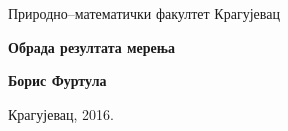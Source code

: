 \documentclass[a4paper,twoside]{book}
\begin{document}
\frontmatter
{}
\baselineskip=0.30in
\allowdisplaybreaks

\begin{center}

\begin{sffamily}

{\large Природно--математички факултет Крагујевац}

\thispagestyle{empty}


\vspace*{7cm}
{\mdseries
{\HUGE\textbf{Обрада резултата мерења}}}

\vspace*{2cm}

{\Large\textbf{Борис Фуртула}}

\vfill

{\large Крагујевац, 2016.}
\end{sffamily}
\end{center}
\newpage


\baselineskip=0.22in

\tableofcontents

\baselineskip=0.28in

\newpage
\setcounter{chapter}{0}

\mainmatter





\end{document}

